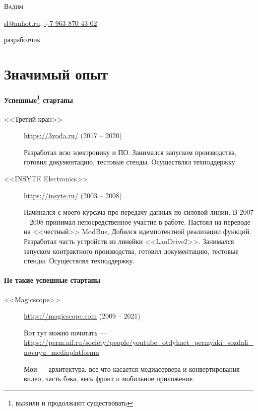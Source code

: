 \documentclass [a4paper,10pt]{article}
\begin{document}
\begin{center}
{\scshape\LARGE Вадим \par}
\Letter\hspace{6pt}\href{mailto:sl@anhot.ru}{sl@anhot.ru},
\Mobilefone\hspace{6pt}\href{tel:+79638704302}{+7 963 870 43 02}

разработчик
\end{center}
\section*{Значимый опыт}
\paragraph{Успешные\protect\footnote{выжили и продолжают существовать} стартапы}
\begin{description}
\item[<<Третий кран>>] \url{https://3voda.ru/} (2017 -- 2020)

Разработал всю электронику и ПО. Занимался запуском производства, готовил документацию, тестовые стенды. Осуществлял техподдержку

\item[<<INSYTE Electronics>>] \url{https://insyte.ru/} (2003 -- 2008)

Начинался с моего курсача про передачу данных по силовой линии. В 2007 -- 2008 принимал непосредственное участие в работе.
Настоял на переводе на <<честный>> ModBus, Добился идемпотентной реализации функций. Разработал часть устройств из линейки <<LanDrive2>>.
Занимался запуском контрактного производства, готовил документацию, тестовые стенды. Осуществлял техподдержку.
\end{description}

\paragraph{Не такие успешные стартапы}
\begin{description}
\item[<<Magicscope>>] \url{https://magicscope.com} (2009 -- 2021)

Вот тут можно почитать --- \url{https://perm.aif.ru/society/people/youtube_otdyhaet_permyaki_sozdali_novuyu_mediaplatformu}
	
Мои --- архитектура, все что касается медиасервера и конвертирования видео, часть бэка, весь фронт и мобильное приложение.
\end{description}
\end{document}
